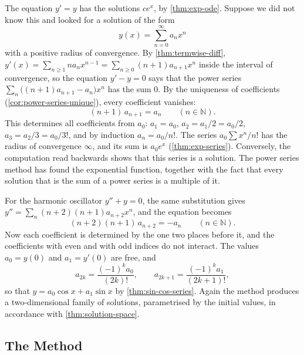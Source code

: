 The equation $y'=y$ has the solutions $ce^x$, by \cref{thm:exp-ode}. Suppose we did not know this and looked for a solution of the form
\[
y(x)=\sum_{n=0}^\infty a_nx^n
\]
with a positive radius of convergence. By \cref{thm:termwise-diff}, $y'(x)=\sum_{n\ge1}na_nx^{n-1}=\sum_{n\ge0}(n+1)a_{n+1}x^n$ inside the interval of convergence, so the equation $y'-y=0$ says that the power series $\sum_n\bigl((n+1)a_{n+1}-a_n\bigr)x^n$ has the sum $0$. By the uniqueness of coefficients (\cref{cor:power-series-unique}), every coefficient vanishes:
\[
(n+1)\,a_{n+1}=a_n\qquad(n\in\mathbb N).
\]
This  determines all coefficients from $a_0$: $a_1=a_0$, $a_2=a_1/2=a_0/2$, $a_3=a_2/3=a_0/3!$, and by induction $a_n=a_0/n!$. The series $a_0\sum x^n/n!$ has the radius of convergence $\infty$, and its sum is $a_0e^x$ (\cref{thm:exp-series}). Conversely, the computation read backwards shows that this series is a solution. The power series method has found the exponential function, together with the fact that every solution that is the sum of a power series is a multiple of it.

For the harmonic oscillator $y''+y=0$, the same substitution gives $y''=\sum_n(n+2)(n+1)a_{n+2}x^n$, and the equation becomes
\[
(n+2)(n+1)\,a_{n+2}=-a_n\qquad(n\in\mathbb N).
\]
Now each coefficient is determined by the one two places before it, and the coefficients with even and with odd indices do not interact. The values $a_0=y(0)$ and $a_1=y'(0)$ are free, and
\[
a_{2k}=\frac{(-1)^ka_0}{(2k)!},\qquad a_{2k+1}=\frac{(-1)^ka_1}{(2k+1)!},
\]
so that $y=a_0\cos x+a_1\sin x$ by \cref{thm:sin-cos-series}. Again the method produces a two-dimensional family of solutions, parametrised by the initial values, in accordance with \cref{thm:solution-space}.

\subsection{The Method}


